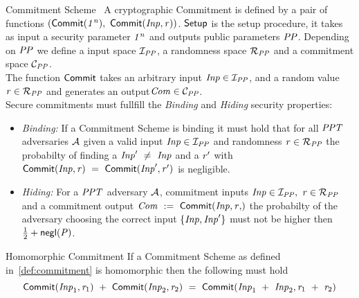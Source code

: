 \begin{definition}{Commitment Scheme}\label{def:commitment}~\cite{bunz2018bulletproofs}
    A cryptographic Commitment is defined by a pair of functions $(\mathsf{Commit}(\mathit{1^n}) ,~ \mathsf{Commit}(\mathit{Inp}, \mathit{r}))$. $\mathsf{Setup}$ is the setup procedure, it takes as input a
    security parameter $\mathit{1^n}$ and outputs public parameters $\mathit{PP}$. Depending on $\mathit{PP}$ we define a input space $\mathcal{I}_{\mathit{PP}}$,
    a randomness space $\mathcal{R}_{\mathit{PP}}$ and a commitment space $\mathcal{C}_{\mathit{PP}}$.\\
    The function $\mathsf{Commit}$ takes an arbitrary input $\mathit{Inp} \in \mathcal{I}_{\mathit{PP}}$, and a random value $\mathit{r} \in \mathcal{R}_{\mathit{PP}}$ and
    generates an output$\mathit{Com} \in \mathcal{C}_{\mathit{PP}}$.\\
    Secure commitments must fullfill the \textit{Binding} and \textit{Hiding} security properties:
    \begin{itemize}
        \item \textit{Binding:} If a Commitment Scheme is binding it must hold that for all $\mathit{PPT}$ adversaries $\mathcal{A}$ given a valid input $\mathit{Inp} \in \mathcal{I}_{\mathit{PP}}$
        and randomness $\mathit{r} \in \mathcal{R}_{\mathit{PP}}$ the probabilty of finding a $\mathit{Inp}' ~\neq~ \mathit{Inp}$ and a $\mathit{r}'$ with
        $\mathsf{Commit}(\mathit{Inp}, \mathit{r}) ~=~ \mathsf{Commit}(\mathit{Inp}', \mathit{r}')$ is negligible.
        \item \textit{Hiding:} For a $\mathit{PPT}$ adversary $\mathcal{A}$, commitment inputs $\mathit{Inp} \in \mathcal{I}_{\mathit{PP}} ,~ \mathit{r} \in
       \mathcal{R}_{\mathit{PP}}$ and a commitment output $\varCommitment \opAssign \procCommit{\varInput, \varRand}$ the probabilty of the adversary choosing the correct input
        $\{\mathit{Inp}, \mathit{Inp}'\}$ must not be higher then $\frac{1}{2} + \mathsf{negl}(\mathit{P})$.
    \end{itemize}
\end{definition}

\begin{definition}{Homomorphic Commitment}\label{def:homomorphicCom}
    If a Commitment Scheme as defined in~\ref{def:commitment} is homomorphic then the following must hold
    \[ \mathsf{Commit}(\mathit{Inp}_1, \mathit{r}_1) ~+~ \mathsf{Commit}(\mathit{Inp}_2, \mathit{r}_2) ~=~ \mathsf{Commit}(\mathit{Inp}_1 ~+~ \mathit{Inp}_2, \mathit{r}_1 ~+~ \mathit{r}_2) \]
\end{definition}

